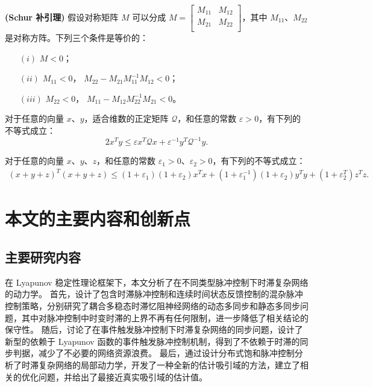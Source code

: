 \begin{lemma} \textbf{(Schur 补引理)}\label{l1-3-6}  \cite{horn2012matrix} 假设对称矩阵 $M$ 可以分成 $M=\left[\begin{array}{cc}
    M_{11}&M_{12}\\
    M_{21}&M_{22}\\
    \end{array}
    \right]$，其中 $M_{11}$、$M_{22}$ 是对称方阵。下列三个条件是等价的：
    \begin{itemize}
        \item[$(i)$] $M<0$；
        \item[$(ii)$] $M_{11}<0$， $M_{22}-M_{21}M_{11}^{-1}M_{12}<0$；
        \item[$(iii)$] $M_{22}<0$， $M_{11}-M_{12}M_{22}^{-1}M_{21}<0$。
    \end{itemize}
\end{lemma}
\begin{lemma}\cite{boyd1994linear}\label{l1-3-7} 对于任意的向量 $x$、$y$，适合维数的正定矩阵 $\mathcal{Q}$，和任意的常数  $\varepsilon>0$，有下列的不等式成立：
    $$2x^Ty\leq \varepsilon x^T\mathcal{Q}x+ \varepsilon^{-1} y^T\mathcal{Q}^{-1}y.$$
\end{lemma}
\begin{lemma}\cite{liu2018consensus134}\label{l1-3-8}
对于任意的向量 $x$、$y$、$z$，和任意的常数  $\varepsilon_1>0$、$\varepsilon_2>0$，有下列的不等式成立：
    \begin{align*}(x+y+z)^T(x+y+z)\leq(1+\varepsilon_1)(1+\varepsilon_2) x^T x+  
(1+\varepsilon^{-1}_1)(1+\varepsilon_2)y^Ty +(1+\varepsilon^T_2)z^Tz.
 \end{align*} 
\end{lemma}    

\section{本文的主要内容和创新点}
\subsection{主要研究内容}
在 Lyapunov 稳定性理论框架下，本文分析了在不同类型脉冲控制下时滞复杂网络的动力学。
首先，设计了包含时滞脉冲控制和连续时间状态反馈控制的混杂脉冲控制策略，分别研究了耦合多稳态时滞忆阻神经网络的动态多同步和静态多同步问题，其中对脉冲控制中时变时滞的上界不再有任何限制，进一步降低了相关结论的保守性。
随后，讨论了在事件触发脉冲控制下时滞复杂网络的同步问题，设计了新型的依赖于 Lyapunov 函数的事件触发脉冲控制机制，得到了不依赖于时滞的同步判据，减少了不必要的网络资源浪费。 
最后，通过设计分布式饱和脉冲控制分析了时滞复杂网络的局部动力学，开发了一种全新的估计吸引域的方法，建立了相关的优化问题，并给出了最接近真实吸引域的估计值。


